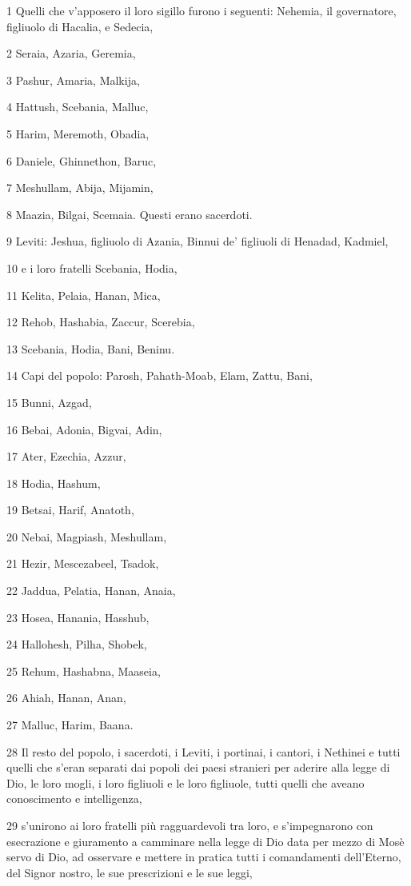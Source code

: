 \par 1 Quelli che v'apposero il loro sigillo furono i seguenti: Nehemia, il governatore, figliuolo di Hacalia, e Sedecia,
\par 2 Seraia, Azaria, Geremia,
\par 3 Pashur, Amaria, Malkija,
\par 4 Hattush, Scebania, Malluc,
\par 5 Harim, Meremoth, Obadia,
\par 6 Daniele, Ghinnethon, Baruc,
\par 7 Meshullam, Abija, Mijamin,
\par 8 Maazia, Bilgai, Scemaia. Questi erano sacerdoti.
\par 9 Leviti: Jeshua, figliuolo di Azania, Binnui de' figliuoli di Henadad, Kadmiel,
\par 10 e i loro fratelli Scebania, Hodia,
\par 11 Kelita, Pelaia, Hanan, Mica,
\par 12 Rehob, Hashabia, Zaccur, Scerebia,
\par 13 Scebania, Hodia, Bani, Beninu.
\par 14 Capi del popolo: Parosh, Pahath-Moab, Elam, Zattu, Bani,
\par 15 Bunni, Azgad,
\par 16 Bebai, Adonia, Bigvai, Adin,
\par 17 Ater, Ezechia, Azzur,
\par 18 Hodia, Hashum,
\par 19 Betsai, Harif, Anatoth,
\par 20 Nebai, Magpiash, Meshullam,
\par 21 Hezir, Mescezabeel, Tsadok,
\par 22 Jaddua, Pelatia, Hanan, Anaia,
\par 23 Hosea, Hanania, Hasshub,
\par 24 Hallohesh, Pilha, Shobek,
\par 25 Rehum, Hashabna, Maaseia,
\par 26 Ahiah, Hanan, Anan,
\par 27 Malluc, Harim, Baana.
\par 28 Il resto del popolo, i sacerdoti, i Leviti, i portinai, i cantori, i Nethinei e tutti quelli che s'eran separati dai popoli dei paesi stranieri per aderire alla legge di Dio, le loro mogli, i loro figliuoli e le loro figliuole, tutti quelli che aveano conoscimento e intelligenza,
\par 29 s'unirono ai loro fratelli più ragguardevoli tra loro, e s'impegnarono con esecrazione e giuramento a camminare nella legge di Dio data per mezzo di Mosè servo di Dio, ad osservare e mettere in pratica tutti i comandamenti dell'Eterno, del Signor nostro, le sue prescrizioni e le sue leggi,
